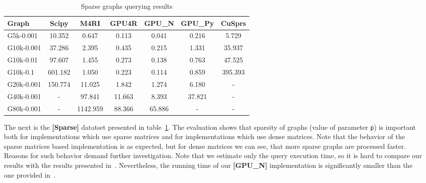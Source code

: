 {\setlength{\tabcolsep}{0.25em}
\begin{table}[H]
\caption{Sparse graphs querying results}
\label{tbl:tableSparse}
\begin{tabular}{| l | c | c | c | c | c | c | }
    \hline
    Graph              & Scipy   & M4RI     & GPU4R  & GPU\_N & GPU\_Py & CuSprs  \\
    \hline
    \hline
    \small{G5k-0.001}  & 10.352  & 0.647    & 0.113  & 0.041  & 0.216   & 5.729   \\
    \small{G10k-0.001} & 37.286  & 2.395    & 0.435  & 0.215  & 1.331   & 35.937  \\
    \small{G10k-0.01}  & 97.607  & 1.455    & 0.273  & 0.138  & 0.763   & 47.525  \\
    \small{G10k-0.1}   & 601.182 & 1.050    & 0.223  & 0.114  & 0.859   & 395.393 \\
    \small{G20k-0.001} & 150.774 & 11.025   & 1.842  & 1.274  & 6.180   & -       \\
    \small{G40k-0.001} & -       & 97.841   & 11.663 & 8.393  & 37.821  & -       \\
    \small{G80k-0.001} & -       & 1142.959 & 88.366 & 65.886 & -       & -       \\
    \hline
  \end{tabular}
\end{table}
}

The next is the \textbf{[Sparse]} datatset presented in table~\ref{tbl:tableSparse}.
The evaluation shows that sparsity of graphs (value of parameter \texttt{p}) is important both for implementations which use sparse matrices and for implementations which use dense matrices.
Note that the behavior of the sparse matrices based implementation is as expected, but for dense matrices we can see, that more sparse graphs are processed faster.
Reasons for such behavior demand further investigation.
Note that we estimate only the query execution time, so it is hard to compare our results with the results presented in~\cite{fan2018scaling}.
Nevertheless, the running time of our \textbf{[GPU\_N]} implementation is significantly smaller than the one provided in~\cite{fan2018scaling}.

